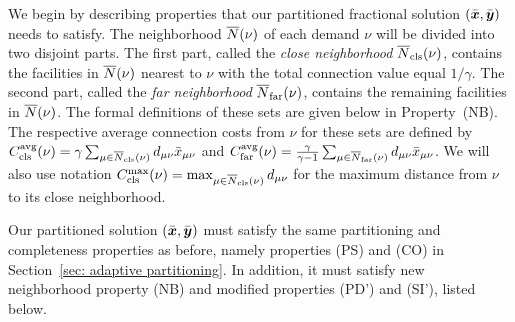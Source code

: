 \documentclass{llncs}
\begin{document}
We begin by describing properties that our partitioned fractional
solution $(\bar{\boldsymbol{x}},\bar{\boldsymbol{y}})$ needs to satisfy. The neighborhood
${\overline{N}}(\nu)$ of each demand $\nu$ will be divided into two disjoint
parts.  The first part, called the \emph{close neighborhood}
${\overline{N}}_{\text{cls}}(\nu)$, contains the facilities in ${\overline{N}}(\nu)$ nearest to
$\nu$ with the total connection value equal $1/\gamma$. The second
part, called the \emph{far neighborhood} ${\overline{N}}_{\text{far}}(\nu)$, contains
the remaining facilities in ${\overline{N}}(\nu)$. The formal definitions of
these sets are given below in Property~(NB).  The respective average
connection costs from $\nu$ for these sets are defined by
$C_{\text{cls}}^{{\mbox{\scriptsize\rm avg}}}(\nu)=\gamma\sum_{\mu\in{\overline{N}}_{\text{cls}}(\nu)}
d_{\mu\nu}{\bar x}_{\mu\nu}$ and
$C_{\text{far}}^{{\mbox{\scriptsize\rm avg}}}(\nu)=\frac{\gamma}{\gamma-1}\sum_{\mu\in{\overline{N}}_{\text{far}}(\nu)}
d_{\mu\nu}{\bar x}_{\mu\nu}$. We will also use notation
$C_{\text{cls}}^{\max}(\nu)=\max_{\mu\in{\overline{N}}_{\text{cls}}(\nu)} d_{\mu\nu}$ for the maximum
distance from $\nu$ to its close neighborhood.

Our partitioned solution $(\bar{\boldsymbol{x}},\bar{\boldsymbol{y}})$ must satisfy the same
partitioning and completeness properties as before, namely properties
(PS) and (CO) in Section~\ref{sec: adaptive partitioning}.  In
addition, it must satisfy new neighborhood property (NB) and modified
properties (PD') and (SI'), listed below.
\end{document}

